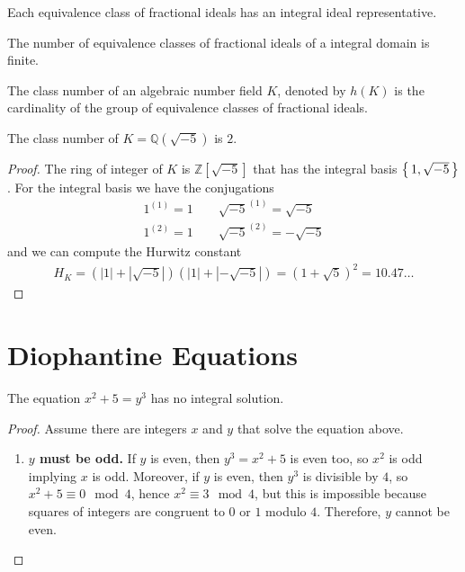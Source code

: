 \begin{thmbox}
    \begin{theorem}
        Each equivalence class of fractional ideals has an integral ideal representative.
    \end{theorem}
\end{thmbox}

\begin{thmbox}
    \begin{theorem}
        The number of equivalence classes of fractional ideals of a integral domain is finite.
    \end{theorem}
\end{thmbox}

\begin{defbox}
    \begin{definition}
        The class number of an algebraic number field \(K\), denoted by \(h(K)\) is the cardinality of the group of equivalence classes of fractional ideals.
    \end{definition}
\end{defbox}

\begin{example}
    The class number of \(K = \mathbb{Q}(\sqrt{-5})\) is \(2\).
\end{example}
\begin{proof}
    The ring of integer of \(K\) is \(\mathbb{Z}[\sqrt{-5}]\) that has the integral basis \(\left\{\, 1, \sqrt{-5} \,\right\}\). For the integral basis we have the conjugations
    \begin{align*}
        1^{(1)} = 1 \qquad \sqrt{-5}^{(1)} = \sqrt{-5}\\
        1^{(2)} = 1 \qquad \sqrt{-5}^{(2)} = -\sqrt{-5}
    \end{align*}
    and we can compute the Hurwitz constant
    \begin{align*}
        H_K = \left(|1| + |\sqrt{-5}|\right) \left(|1| + |-\sqrt{-5}|\right) = (1 + \sqrt{5})^2 = 10.47\ldots
    \end{align*}
\end{proof}

\section*{Diophantine Equations}

\begin{example}
    The equation \(x^2 + 5 = y^3\) has no integral solution.
\end{example}
\begin{proof}
    Assume there are integers \(x\) and \(y\) that solve the equation above.
    \begin{enumerate}
        \item \textbf{\(y\) must be odd.} If \(y\) is even, then \(y^3 = x^2 + 5\) is even too, so \(x^2\) is odd implying \(x\) is odd. Moreover, if \(y\) is even, then \(y^3\) is divisible by \(4\), so \(x^2 + 5 \equiv 0 \mod{4}\), hence \(x^2 \equiv 3 \mod{4}\), but this is impossible because squares of integers are congruent to \(0\) or \(1\) modulo \(4\). Therefore, \(y\) cannot be even.
    \end{enumerate}
\end{proof}